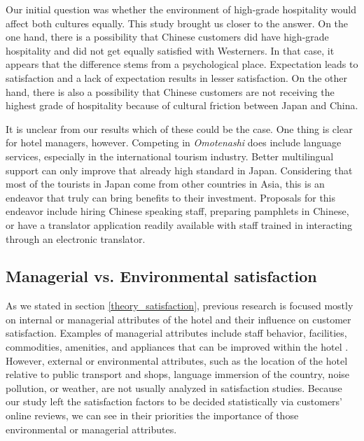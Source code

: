 \documentclass[smallextended,natbib]{svjour3}       %
\begin{document}
Our initial question was whether the environment of high-grade hospitality would affect both cultures equally. This study brought us closer to the answer. On the one hand, there is a possibility that Chinese customers did have high-grade hospitality and did not get equally satisfied with Westerners. In that case, it appears that the difference stems from a psychological place. Expectation leads to satisfaction and a lack of expectation results in lesser satisfaction. On the other hand, there is also a possibility that Chinese customers are not receiving the highest grade of hospitality because of cultural friction between Japan and China. 

It is unclear from our results which of these could be the case. One thing is clear for hotel managers, however. Competing in \textit{Omotenashi} does include language services, especially in the international tourism industry. Better multilingual support can only improve that already high standard in Japan. Considering that most of the tourists in Japan come from other countries in Asia, this is an endeavor that truly can bring benefits to their investment. Proposals for this endeavor include hiring Chinese speaking staff, preparing pamphlets in Chinese, or have a translator application readily available with staff trained in interacting through an electronic translator.

\subsection{Managerial vs. Environmental satisfaction}\label{disc:man_env}

As we stated in section \ref{theory_satisfaction}, previous research is focused mostly on internal or managerial attributes of the hotel and their influence on customer satisfaction. Examples of managerial attributes include staff behavior, facilities, commodities, amenities, and appliances that can be improved within the hotel \cite[e.g.][]{shanka2004, choi2001}. However, external or environmental attributes, such as the location of the hotel relative to public transport and shops, language immersion of the country, noise pollution, or weather, are not usually analyzed in satisfaction studies. Because our study left the satisfaction factors to be decided statistically via customers' online reviews, we can see in their priorities the importance of those environmental or managerial attributes. 
\end{document}
